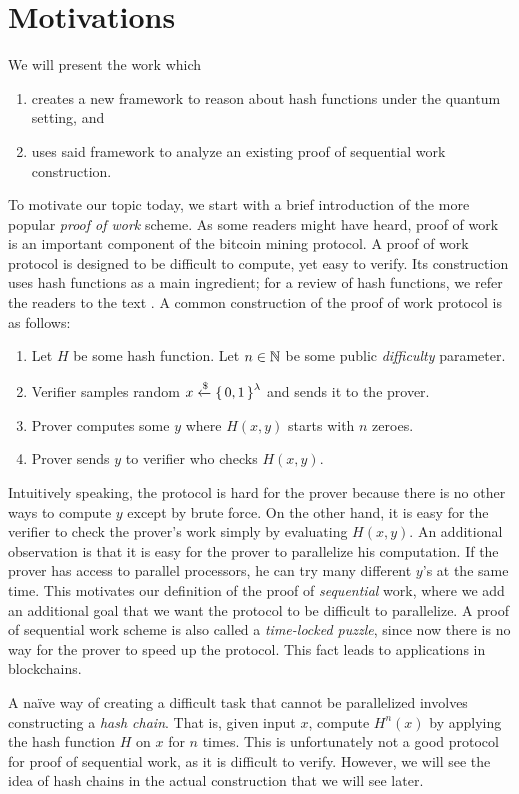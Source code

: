 \section{Motivations}

We will present the work \cite{main-result} which
\begin{enumerate}
	\item creates a new framework to reason about hash functions under the quantum setting, and
	\item uses said framework to analyze an existing proof of sequential work construction.
\end{enumerate}

To motivate our topic today, we start with a brief introduction of the more popular \emph{proof of work} scheme.
As some readers might have heard, proof of work is an important component of the bitcoin mining protocol.
A proof of work protocol is designed to be difficult to compute, yet easy to verify.
Its construction uses hash functions as a main ingredient; for a review of hash functions, we refer the readers to the text \cite{intro-algo}.
A common construction of the proof of work protocol is as follows:
\begin{enumerate}
	\item
		Let $H$ be some hash function.
		Let $n\in\mathbb{N}$ be some public \emph{difficulty} parameter.
	\item Verifier samples random $x\xleftarrow{\$}\set{0, 1}^{\lambda}$ and sends it to the prover.
	\item Prover computes some $y$ where $H(x, y)$ starts with $n$ zeroes.
	\item Prover sends $y$ to verifier who checks $H(x, y)$.
\end{enumerate}

Intuitively speaking, the protocol is hard for the prover because there is no other ways to compute $y$ except by brute force.
On the other hand, it is easy for the verifier to check the prover's work simply by evaluating $H(x, y)$.
An additional observation is that it is easy for the prover to parallelize his computation.
If the prover has access to parallel processors, he can try many different $y$'s at the same time.
This motivates our definition of the proof of \emph{sequential} work,
where we add an additional goal that we want the protocol to be difficult to parallelize.
A proof of sequential work scheme is also called a \emph{time-locked puzzle},
since now there is no way for the prover to speed up the protocol.
This fact leads to applications in blockchains.

A na\"ive way of creating a difficult task that cannot be parallelized involves constructing a \emph{hash chain}.
That is, given input $x$, compute $H^n(x)$ by applying the hash function $H$ on $x$ for $n$ times.
This is unfortunately not a good protocol for proof of sequential work, as it is difficult to verify.
However, we will see the idea of hash chains in the actual construction that we will see later.
